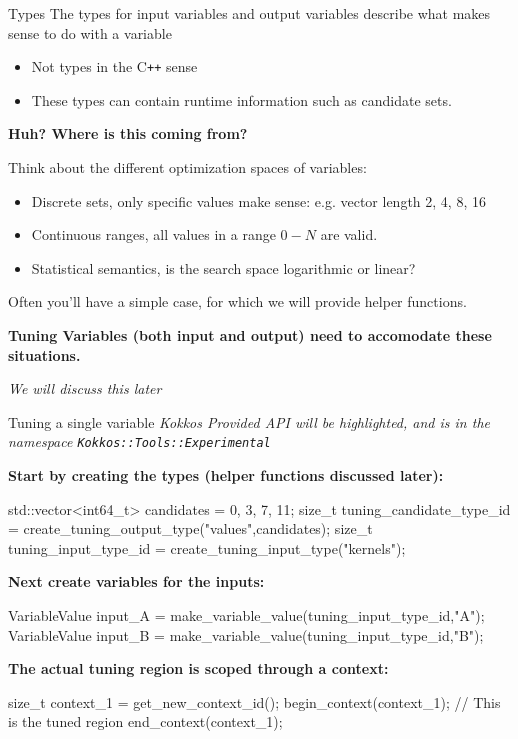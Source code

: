 \begin{frame}[fragile]{Types}
The types for input variables and output variables describe what makes sense to do with a variable
\begin{itemize}
  \item Not types in the C\texttt{++} sense
  \item These types can contain runtime information such as candidate sets.
\end{itemize}

\pause
\vspace{5pt}
\textbf{Huh? Where is this coming from?}

Think about the different optimization spaces of variables:
\begin{itemize}
\item Discrete sets, only specific values make sense: e.g. vector length 2, 4, 8, 16
\item Continuous ranges, all values in a range $0-N$ are valid.
\item Statistical semantics, is the search space logarithmic or linear?
\end{itemize}

Often you'll have a simple case, for which we will provide helper functions.

\pause
\textbf{Tuning Variables (both input and output) need to accomodate these situations.}

\vspace{5pt}
\textit{We will discuss this later}
\end{frame}

\begin{frame}[fragile]{Tuning a single variable}
\textit{Kokkos Provided API will be highlighted, and is in the namespace \texttt{Kokkos::Tools::Experimental}}

\vspace{5pt}
\textbf{Start by creating the types (helper functions discussed later):}
\begin{code}
std::vector<int64_t> candidates = {0, 3, 7, 11};
size_t tuning_candidate_type_id = 
  create_tuning_output_type("values",candidates);
size_t tuning_input_type_id = 
  create_tuning_input_type("kernels");
\end{code}

\textbf{Next create variables for the inputs:}
\begin{code}[keywords={VariableValue,make_variable_value}]
VariableValue input_A = 
  make_variable_value(tuning_input_type_id,"A");
VariableValue input_B = 
  make_variable_value(tuning_input_type_id,"B");
\end{code}

\textbf{The actual tuning region is scoped through a context:}
\begin{code}[keywords={get_new_context_id,begin_context,end_context}]
size_t context_1 = get_new_context_id();
begin_context(context_1);
// This is the tuned region
end_context(context_1);
\end{code}
\end{frame}



